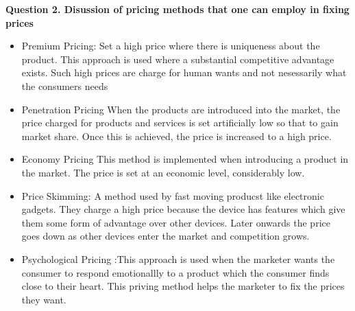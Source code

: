 \documentclass[12pt, a4]{article}
\begin{document}
\textbf{Question 2. Disussion of pricing methods that one can employ in fixing prices}
\begin{itemize}
  
\item{Premium Pricing: Set a high price where there is uniqueness about the product.
This approach is  used where a substantial competitive advantage exists.
Such high prices are charge for human wants and not nesessarily what the
consumers needs}

\item{Penetration Pricing  When the products are introduced into the market, the
price charged for products and services is set artificially low so that to
gain market share. Once this is achieved, the price is increased to a high price.}

\item{Economy Pricing  This method is implemented when introducing a product in the
market. The price is set at an economic level, considerably low.}

\item{Price Skimming: A method used by fast moving producst like electronic gadgets.
They charge a high price because the device has features which give them some
form of advantage over other devices. Later onwards the price goes down as other
devices enter the market and competition grows.}

\item{Psychological Pricing :This approach is used when the marketer wants the
consumer to respond emotionallly to a product which the consumer finds close to
their heart. This priving method helps the marketer to fix the prices they
want.}

\end{itemize}
\end{document}
